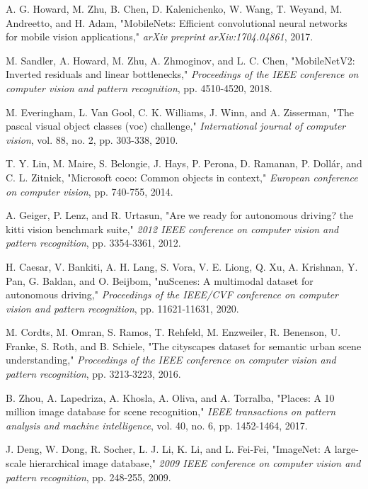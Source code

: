 \begin{thebibliography}{99}
A. G. Howard, M. Zhu, B. Chen, D. Kalenichenko, W. Wang, T. Weyand, M. Andreetto, and H. Adam, "MobileNets: Efficient convolutional neural networks for mobile vision applications," \textit{arXiv preprint arXiv:1704.04861}, 2017.

M. Sandler, A. Howard, M. Zhu, A. Zhmoginov, and L. C. Chen, "MobileNetV2: Inverted residuals and linear bottlenecks," \textit{Proceedings of the IEEE conference on computer vision and pattern recognition}, pp. 4510-4520, 2018.

M. Everingham, L. Van Gool, C. K. Williams, J. Winn, and A. Zisserman, "The pascal visual object classes (voc) challenge," \textit{International journal of computer vision}, vol. 88, no. 2, pp. 303-338, 2010.

T. Y. Lin, M. Maire, S. Belongie, J. Hays, P. Perona, D. Ramanan, P. Dollár, and C. L. Zitnick, "Microsoft coco: Common objects in context," \textit{European conference on computer vision}, pp. 740-755, 2014.

A. Geiger, P. Lenz, and R. Urtasun, "Are we ready for autonomous driving? the kitti vision benchmark suite," \textit{2012 IEEE conference on computer vision and pattern recognition}, pp. 3354-3361, 2012.

H. Caesar, V. Bankiti, A. H. Lang, S. Vora, V. E. Liong, Q. Xu, A. Krishnan, Y. Pan, G. Baldan, and O. Beijbom, "nuScenes: A multimodal dataset for autonomous driving," \textit{Proceedings of the IEEE/CVF conference on computer vision and pattern recognition}, pp. 11621-11631, 2020.

M. Cordts, M. Omran, S. Ramos, T. Rehfeld, M. Enzweiler, R. Benenson, U. Franke, S. Roth, and B. Schiele, "The cityscapes dataset for semantic urban scene understanding," \textit{Proceedings of the IEEE conference on computer vision and pattern recognition}, pp. 3213-3223, 2016.

B. Zhou, A. Lapedriza, A. Khosla, A. Oliva, and A. Torralba, "Places: A 10 million image database for scene recognition," \textit{IEEE transactions on pattern analysis and machine intelligence}, vol. 40, no. 6, pp. 1452-1464, 2017.

J. Deng, W. Dong, R. Socher, L. J. Li, K. Li, and L. Fei-Fei, "ImageNet: A large-scale hierarchical image database," \textit{2009 IEEE conference on computer vision and pattern recognition}, pp. 248-255, 2009.


\end{thebibliography}

